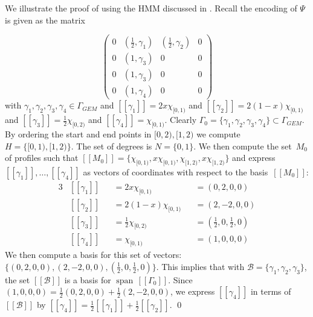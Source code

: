 \documentclass[a4paper,UKenglish,cleveref, autoref,mathscr]{lipics-v2019}
\newcommand{\1}{\mathbbm{1}}
\newcommand{\pl}{\Gamma_{\mathit{GEM}}}
\DeclareMathOperator{\Span}{span\,}
\begin{document}
\begin{example}\label{lineardecompexample}
We illustrate the proof of  using the HMM discussed in . Recall the encoding of $\Psi$ is given as the matrix

\[
\begin{pmatrix}
0 & (\frac12, \gamma_1)  & (\frac12,\gamma_2) & 0 \\
0 & (1,\gamma_3) & 0 & 0 \\
0 & (1,\gamma_3) & 0 & 0 \\
0 & (1,\gamma_4) & 0 & 0
\end{pmatrix}
\]
with $\gamma_1, \gamma_2, \gamma_3, \gamma_4 \in \pl$ and
$[\![\gamma_1]\!] = 2x\chi_{[0,1)}$ and
$[\![\gamma_2]\!] = 2(1-x)\chi_{[0,1)}$ and
$[\![\gamma_3]\!] = \frac12 \chi_{[0,2)}$ and
$[\![\gamma_4]\!] = \chi_{[0,1)}$.
Clearly $\Gamma_0 = \{\gamma_1, \gamma_2, \gamma_3, \gamma_4\} \subset \pl$. By ordering the start and end points in $[0,2), [1,2)$ we compute $H = \{[0,1), [1,2)\}$.
The set of degrees is $N = \{0,1\}$.
We then compute the set~$M_0$ of profiles such that $[\![M_0]\!] = \{\chi_{[0,1)}, x\chi_{[0,1)},\chi_{[1,2)}, x\chi_{[1,2)}\}$
and express $[\![\gamma_1]\!], \dots, [\![\gamma_4]\!]$ as vectors of coordinates with respect to the basis~$[\![M_0]\!]$:
\begin{alignat*}{3}
&[\![\gamma_1]\!] && = 2x\chi_{[0,1)}      && = (0, 2, 0, 0) \\
&[\![\gamma_2]\!] && = 2(1-x)\chi_{[0,1)}  && = (2, -2, 0, 0) \\
&[\![\gamma_3]\!] && = \frac12\chi_{[0,2)} && = (\frac12, 0, \frac12, 0) \\
&[\![\gamma_4]\!] && = \chi_{[0,1)}        && = (1,0,0,0)
\end{alignat*}
We then compute a basis for this set of vectors: $\{(0, 2, 0, 0), (2, -2, 0, 0), (\frac12,0,\frac12,0)\}$. This implies that with $\mathcal{B} = \{\gamma_1, \gamma_2, \gamma_3\}$, the set $[\![\mathcal{B}]\!]$ is a basis for $\Span [\![\Gamma_0]\!]$.
Since $(1, 0, 0, 0) = \frac12(0, 2, 0, 0) + \frac12(2, -2, 0, 0)$, we express $[\![\gamma_4]\!]$ in terms of~$[\![\mathcal{B}]\!]$ by $[\![\gamma_4]\!] = \frac12 [\![\gamma_1]\!] + \frac12 [\![\gamma_2]\!]$.
\qed
\end{example}
\end{document}
